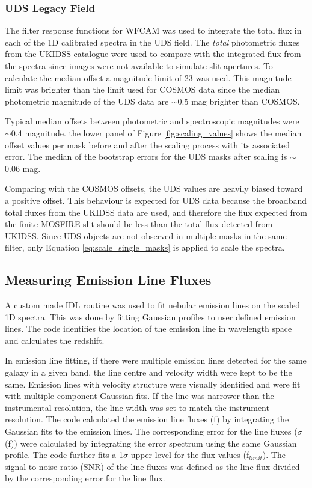\documentclass[iop]{emulateapj}
\newcommand{\around}{$\sim$}
\begin{document}
\subsubsection{UDS Legacy Field}

The filter response functions for WFCAM \citep{Casali2007} was used to integrate the total flux in each of the 1D calibrated spectra in the UDS field. 
The {\it total} photometric fluxes from the UKIDSS catalogue were used to compare with the integrated flux from the spectra since images were not 
available to simulate slit apertures. 
To calculate the median offset a magnitude limit of 23 was used.  
This magnitude limit was brighter than the limit used for COSMOS data since the median photometric magnitude of the UDS data are \around0.5 mag brighter than COSMOS.

Typical median offsets between photometric and spectroscopic magnitudes were \around0.4 magnitude.
the lower panel of Figure \ref{fig:scaling_values} shows the median offset values per mask before and after the scaling process with its associated error. 
The median of the bootstrap errors for the UDS masks after scaling is \around0.06 mag. 

Comparing with the COSMOS offsets, the UDS values are heavily biased toward a positive offset. 
This behaviour is expected for UDS data because the broadband total fluxes from the UKIDSS data are used, and therefore the flux expected from the finite MOSFIRE slit should be less than the total flux detected from UKIDSS. 
Since UDS objects are not observed in multiple masks in the same filter, only Equation \ref{eq:scale_single_masks} is applied to scale the spectra. \\


\subsection{Measuring Emission Line Fluxes}
\label{sec:line_fits}

A custom made IDL routine was used to fit nebular emission lines on the scaled 1D spectra. This was done by fitting Gaussian profiles to user defined emission lines. 
The code identifies the location of the emission line in wavelength space and calculates the redshift.  

In emission line fitting, if there were multiple emission lines detected for the same galaxy in a given band, the line centre and velocity width were kept to be the same. Emission lines with velocity structure were visually identified and were fit with multiple component Gaussian fits.  
If the line was narrower than the instrumental resolution, the line width was set to match the instrument resolution.  
The code calculated the emission line fluxes (f) by integrating the Gaussian fits to the emission lines. The corresponding error for the line fluxes ($\sigma$(f)) were calculated by integrating the error spectrum using the same Gaussian profile. The code further fits a 1$\sigma$ upper level for the flux values (f$_{limit}$). The signal-to-noise ratio (SNR) of the line fluxes was defined as the line flux divided by the corresponding error for the line flux. 
\end{document}
